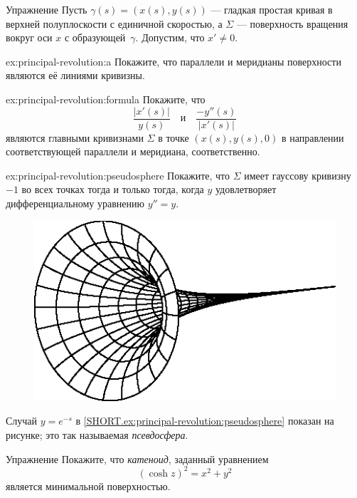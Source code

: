 \begin{thm}{Упражнение}\label{ex:principal-revolution}
Пусть $\gamma(s)=(x(s),y(s))$ --- гладкая простая кривая в верхней полуплоскости с единичной скоростью,
а $\Sigma$ --- поверхность вращения вокруг оси $x$ с образующей~$\gamma$.
Допустим, что $x'\ne 0$.

\begin{subthm}{ex:principal-revolution:a}
Покажите, что параллели и меридианы поверхности являются её линиями кривизны.
\end{subthm}

{\sloppy

\begin{subthm}{ex:principal-revolution:formula}
Покажите, что 
\[\frac{|x'(s)|}{y(s)}
\quad
\text{и}
\quad
\frac{-y''(s)}{|x'(s)|}
\]
являются главными кривизнами $\Sigma$ в точке $(x(s),y(s),0)$ в направлении соответствующей параллели и меридиана, соответственно.
\end{subthm}

}

\begin{subthm}{ex:principal-revolution:pseudosphere}
Покажите, что $\Sigma$ имеет гауссову кривизну $-1$ во всех точках тогда и только тогда, когда $y$ удовлетворяет дифференциальному уравнению $y''=y$. 

\end{subthm}

\end{thm}

{

\begin{figure}
\vskip-6mm
\includegraphics{asy/pseudosphere}
\vskip-3mm
\end{figure}

Случай $y=e^{-s}$ в \ref{SHORT.ex:principal-revolution:pseudosphere} показан на рисунке; это так называемая \emph{псевдосфера}.

\begin{thm}{Упражнение}\label{ex:catenoid-is-minimal}
Покажите, что \emph{катеноид}, заданный уравнением
\[(\cosh z)^2=x^2+y^2\]
является минимальной поверхностью.
\end{thm}

}

